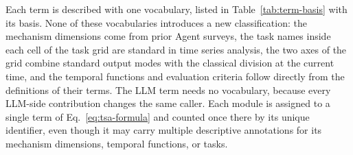 \documentclass[preprints,article,submit,moreauthors]{Definitions/mdpi}
\begin{document}
Each term is described with one vocabulary, listed in Table~\ref{tab:term-basis} with its basis. None of these vocabularies introduces a new classification: the mechanism dimensions come from prior Agent surveys, the task names inside each cell of the task grid are standard in time series analysis, the two axes of the grid combine standard output modes with the classical division at the current time, and the temporal functions and evaluation criteria follow directly from the definitions of their terms. The LLM term needs no vocabulary, because every LLM-side contribution changes the same caller. Each module is assigned to a single term of Eq.~\eqref{eq:tsa-formula} and counted once there by its unique identifier, even though it may carry multiple descriptive annotations for its mechanism dimensions, temporal functions, or tasks.
\end{document}
